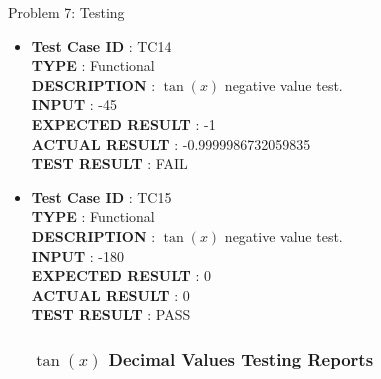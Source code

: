 \documentclass[a4paper,12pt]{article}
\begin{document}
\begin{section}{Problem 7: Testing}
\begin{itemize}
\item \textbf{Test Case ID} \hspace{1.85cm} : TC14  \\
\textbf{TYPE } \hspace{3.05cm}  : Functional\\
\textbf{DESCRIPTION }\hspace{1.15cm} : $\tan(x)$ negative value test. \\
\textbf{INPUT} \hspace{3.05cm} :  -45 \\
\textbf{EXPECTED RESULT} \hspace{0.01cm} : -1 \\
\textbf{ACTUAL RESULT} \hspace{0.6cm} : -0.9999986732059835 \\
\textbf{TEST RESULT} \hspace{1.45cm} : FAIL \\	

\item \textbf{Test Case ID} \hspace{1.85cm} : TC15 \\
\textbf{TYPE } \hspace{3.05cm}  : Functional\\
\textbf{DESCRIPTION }\hspace{1.15cm} : $\tan(x)$ negative value test. \\
\textbf{INPUT} \hspace{3.05cm} :  -180 \\
\textbf{EXPECTED RESULT} \hspace{0.01cm} : 0 \\
\textbf{ACTUAL RESULT} \hspace{0.6cm} : 0 \\
\textbf{TEST RESULT} \hspace{1.45cm} : PASS \\



\subsubsection{$\tan(x)$ Decimal Values Testing Reports}


\end{itemize}
\end{section}
\end{document}
